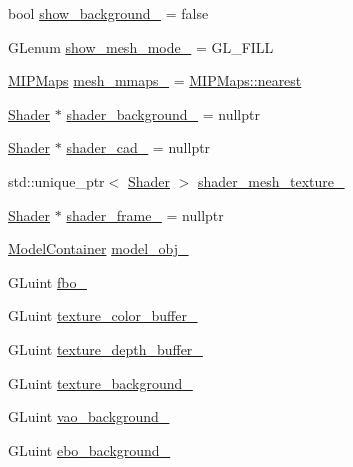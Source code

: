 \begin{DoxyCompactItemize}
\item 
bool \mbox{\hyperlink{classSICAD_a8db9e37d71a14883be4879e9ea4b6a02}{show\+\_\+background\+\_\+}} = false
\item 
G\+Lenum \mbox{\hyperlink{classSICAD_a9c4c3ba5d071f763ee1956fa31faa3f8}{show\+\_\+mesh\+\_\+mode\+\_\+}} = G\+L\+\_\+\+F\+I\+LL
\item 
\mbox{\hyperlink{classSICAD_a7e092dede6f660355462d6d548214198}{M\+I\+P\+Maps}} \mbox{\hyperlink{classSICAD_a34b0de96321855145937cc5858c019b0}{mesh\+\_\+mmaps\+\_\+}} = \mbox{\hyperlink{classSICAD_a7e092dede6f660355462d6d548214198ad879c351426770bc0b13c3628db1e636}{M\+I\+P\+Maps\+::nearest}}
\item 
\mbox{\hyperlink{classShader}{Shader}} $\ast$ \mbox{\hyperlink{classSICAD_a46edf33acc9f7ea3bd98c7ee6388ce9c}{shader\+\_\+background\+\_\+}} = nullptr
\item 
\mbox{\hyperlink{classShader}{Shader}} $\ast$ \mbox{\hyperlink{classSICAD_a6c11f0e8dc8cbdd91748c230fc680833}{shader\+\_\+cad\+\_\+}} = nullptr
\item 
std\+::unique\+\_\+ptr$<$ \mbox{\hyperlink{classShader}{Shader}} $>$ \mbox{\hyperlink{classSICAD_aa9c575d7847080ed891015f457a8fd59}{shader\+\_\+mesh\+\_\+texture\+\_\+}}
\item 
\mbox{\hyperlink{classShader}{Shader}} $\ast$ \mbox{\hyperlink{classSICAD_ac921e60623f3797253bcbcdd445b903b}{shader\+\_\+frame\+\_\+}} = nullptr
\item 
\mbox{\hyperlink{classSICAD_aca3c9693d298f2e8dc171194c6a7507c}{Model\+Container}} \mbox{\hyperlink{classSICAD_a05fea2b5b027a3b7f37ef9ea4ecd64f0}{model\+\_\+obj\+\_\+}}
\item 
G\+Luint \mbox{\hyperlink{classSICAD_a2c173ad18d42e090b46a539f92f3fe9d}{fbo\+\_\+}}
\item 
G\+Luint \mbox{\hyperlink{classSICAD_a50f1ec3b2545ca40d58466735da80fc6}{texture\+\_\+color\+\_\+buffer\+\_\+}}
\item 
G\+Luint \mbox{\hyperlink{classSICAD_a2fed5ac56bb2206fe8f6eccc9d784015}{texture\+\_\+depth\+\_\+buffer\+\_\+}}
\item 
G\+Luint \mbox{\hyperlink{classSICAD_a2728fb0fa0be11f0992bc81b4873da4f}{texture\+\_\+background\+\_\+}}
\item 
G\+Luint \mbox{\hyperlink{classSICAD_a19306fe768bae547e18a3b9366e37389}{vao\+\_\+background\+\_\+}}
\item 
G\+Luint \mbox{\hyperlink{classSICAD_a2cdcd11dd55a4b02b85d7c32435cc719}{ebo\+\_\+background\+\_\+}}
\item 

\end{DoxyCompactItemize}
